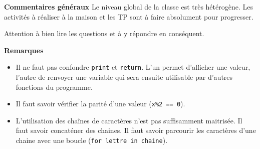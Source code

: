 \documentclass[10pt,fleqn]{article} %
\begin{document}

\pagestyle{fancy}
\thispagestyle{plain}


\def\columnseprulecolor{\color{ocre}}
\setlength{\columnseprule}{0.4pt} 



\vspace{6cm}


\textbf{Commentaires généraux}
Le niveau global de la classe est très hétérogène. Les activités à réaliser à la maison et les TP sont à faire absolument pour progresser.

Attention à bien lire les questions et à y répondre en conséquent. 



\textbf{Remarques}
\begin{itemize}
\item Il ne faut pas confondre \texttt{print} et \texttt{return}. L'un permet d'afficher une valeur, l'autre de renvoyer une variable qui sera ensuite utilisable par d'autres fonctions du programme.
\item Il faut savoir vérifier la parité d'une valeur (\texttt{x\%2 == 0}). 
\item L'utilisation des chaînes de caractères n'est pas suffisamment maitrisée. Il faut savoir concaténer des chaines. Il faut savoir parcourir les caractères d'une chaine avec une boucle (\texttt{for lettre in chaine}).

\end{itemize}






%
\end{document}
